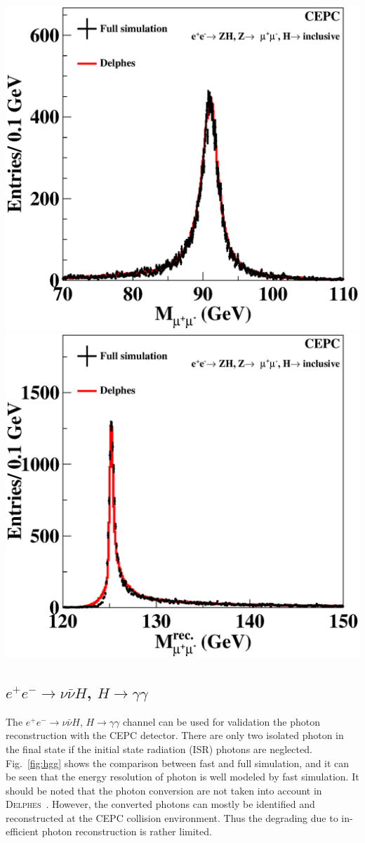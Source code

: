 \documentclass[a4paper,10pt,twoside]{cpc-hepnp}
\begin{document}
\begin{multicols}{2}
\begin{center}
\includegraphics[width=0.49\linewidth]{figs/e2e2h_mass}
\includegraphics[width=0.49\linewidth]{figs/e2e2h_reco}
\end{center}

\subsection{$e^+e^-\to \nu\bar{\nu}H$, $H \to \gamma \gamma$}

The $e^+e^- \to \nu\bar{\nu}H$, $H\to \gamma \gamma$ channel can be used for validation the photon reconstruction with the CEPC detector. 
There are only two isolated photon in the final state if the initial state radiation (ISR) photons are neglected.
Fig.~\ref{fig:hgg} shows the comparison between fast and full simulation,
and it can be seen that the energy resolution of photon is well modeled by fast simulation.
It should be noted that the photon conversion are not taken into account in {\textsc{Delphes}~}.
However, the converted photons can mostly be identified and reconstructed at the CEPC collision environment. 
Thus the degrading due to in-efficient photon reconstruction is rather limited. 


\end{multicols}
\end{document}
